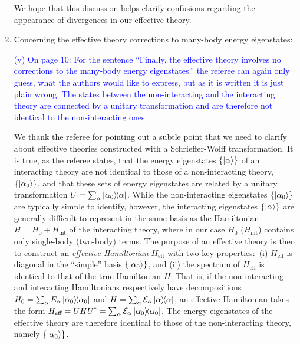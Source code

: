 \documentclass[preprint]{revtex4-1}
\renewcommand{\t}{\text} %
\renewcommand{\set}[1]{\left\{#1\right\}} %
\newcommand{\E}{\mathcal{E}}
\newcommand{\1}{\mathds{1}}
\newcommand{\blue}[1]{\textcolor{blue}{#1}}
\begin{document}
\begin{enumerate}
  We hope that this discussion helps clarify confusions regarding the
  appearance of divergences in our effective theory.


\item Concerning the effective theory corrections to many-body energy
  eigenstates:

  \blue{(v) On page 10: For the sentence ``Finally, the effective
    theory involves no corrections to the many-body energy
    eigenstates.'' the referee can again only guess, what the authors
    would like to express, but as it is written it is just plain
    wrong. The states between the non-interacting and the interacting
    theory are connected by a unitary transformation and are therefore
    not identical to the non-interacting ones. }

  We thank the referee for pointing out a subtle point that we need to
  clarify about effective theories constructed with a Schrieffer-Wolff
  transformation.  It is true, as the referee states, that the energy
  eigenstates $\set{\ket\alpha}$ of an interacting theory are not
  identical to those of a non-interacting theory,
  $\set{\ket{\alpha_0}}$, and that these sets of energy eigenstates
  are related by a unitary transformation
  $U=\sum_\alpha \op{\alpha_0}{\alpha}$.  While the non-interacting
  eigenstates $\set{\ket{\alpha_0}}$ are typically simple to identify,
  however, the interacting eigenstates $\set{\ket\alpha}$ are
  generally difficult to represent in the same basis as the
  Hamiltonian $H=H_0+H_{\t{int}}$ of the interacting theory, where in
  our case $H_0$ ($H_{\t{int}}$) contains only single-body (two-body)
  terms.  The purpose of an effective theory is then to construct an
  {\it effective Hamiltonian} $H_{\t{eff}}$ with two key
  properties:~(i) $H_{\t{eff}}$ is diagonal in the ``simple'' basis
  $\set{\ket{\alpha_0}}$, and (ii) the spectrum of $H_{\t{eff}}$ is
  identical to that of the true Hamiltonian $H$.  That is, if the
  non-interacting and interacting Hamiltonians respectively have
  decompositions $H_0 = \sum_\alpha E_\alpha \op{\alpha_0}$ and
  $H = \sum_\alpha \E_\alpha \op\alpha$, an effective Hamiltonian
  takes the form
  $H_{\t{eff}} = U H U^\dag = \sum_\alpha \E_\alpha \op{\alpha_0}$.
  The energy eigenstates of the effective theory are therefore
  identical to those of the non-interacting theory, namely
  $\set{\ket{\alpha_0}}$.

\end{enumerate}
\end{document}
